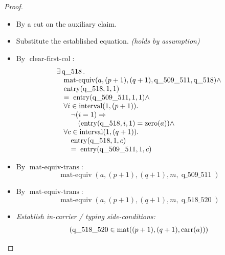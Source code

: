 \documentclass[11pt]{article}
\theoremstyle{plain}
\begin{document}
\begin{proof}
\begin{itemize}[leftmargin=2.8em, itemsep=4pt, parsep=1pt]
  \item[\textbf{38}] By a cut on the auxiliary claim.
  \item[\textbf{39--40}] Substitute the established equation.  \emph{(holds by assumption)}
  \item[\textbf{41}] By $\operatorname{clear\text{-}first\text{-}col}$:
\begin{equation*}
\begin{array}{@{}l@{}} \exists \operatorname{q\_518}. \\ \quad \operatorname{mat\text{-}equiv}(a, (p + 1), (q + 1), \operatorname{q\_509\_511}, \operatorname{q\_518}) \wedge \\ \quad \operatorname{entry}(\operatorname{q\_518}, 1, 1) \\ \quad =\; \operatorname{entry}(\operatorname{q\_509\_511}, 1, 1) \wedge \\ \quad \forall i \in \operatorname{interval}(1, (p + 1)). \\ \quad \quad \neg (i = 1) \Rightarrow  \\ \quad \quad \quad (\operatorname{entry}(\operatorname{q\_518}, i, 1) = \operatorname{zero}(a)) \wedge \\ \quad \forall c \in \operatorname{interval}(1, (q + 1)). \\ \quad \quad \operatorname{entry}(\operatorname{q\_518}, 1, c) \\ \quad \quad =\; \operatorname{entry}(\operatorname{q\_509\_511}, 1, c) \end{array}
\end{equation*}

  \item[\textbf{42--46}] By $\operatorname{mat\text{-}equiv\text{-}trans}$:
\begin{equation*}
\operatorname{mat\text{-}equiv}(a, (p + 1), (q + 1), m, \operatorname{q\_509\_511})
\end{equation*}

  \item[\textbf{47}] By $\operatorname{mat\text{-}equiv\text{-}trans}$:
\begin{equation*}
\operatorname{mat\text{-}equiv}(a, (p + 1), (q + 1), m, \operatorname{q\_518\_520})
\end{equation*}

  \item[\textbf{48}] \emph{Establish in-carrier / typing side-conditions:}
\begin{equation*}
\begin{array}{@{}l@{}}
(\operatorname{q\_518\_520} \in \operatorname{mat}((p + 1), (q + 1), \operatorname{carr}(a)))
\end{array}
\end{equation*}


\end{itemize}
\end{proof}
\end{document}
